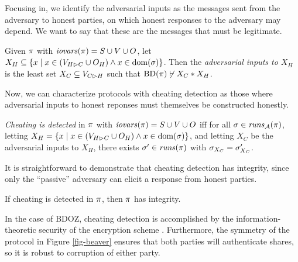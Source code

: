 Focusing in, we identify the adversarial inputs as the messages
sent from the adversary to honest parties, on which honest responses
to the adversary may depend. We want to say that these are the messages
that must be legitimate.
\begin{definition}
  Given $\pi$ with $\mathit{iovars}(\pi) = S \cup V \cup O$,
  let $X_H \subseteq \{ x \mid x \in (V_{H \rhd C} \cup O_H) \wedge x \in \mathrm{dom}(\sigma) \}$.
  Then the \emph{adversarial inputs to $X_H$} is the least set
  $X_C \subseteq V_{C \rhd H}$ such that $\mathrm{BD}(\pi) \not\vdash X_C * X_H$.
\end{definition}
Now, we can characterize protocols with cheating detection as those where
adversarial inputs to honest reponses must themselves be constructed honestly. 
\begin{definition}
  \emph{Cheating is detected} in $\pi$ with $\mathit{iovars}(\pi) = S \cup V \cup O$ iff
  for all  $\sigma \in \mathit{runs}_{\mathcal{A}}(\pi)$,
  letting $X_H = \{ x \mid x \in (V_{H \rhd C} \cup O_H) \wedge x \in \mathrm{dom}(\sigma) \}$,
  and letting $X_C$ be the adversarial inputs to $X_H$,
  there exists $\sigma'\in \mathit{runs}(\pi)$
  with $\sigma_{X_C} = \sigma'_{X_C}$.  
\end{definition}

It is straightforward to demonstrate that cheating detection has integrity,
since only the ``passive'' adversary can elicit a response from honest parties. 
\begin{lemma}
  \label{lemma-cheating}
  If cheating is detected in $\pi$, then $\pi$ has integrity.
\end{lemma}

In the case of BDOZ, cheating detection is accomplished by the information-theoretic
security of the encryption scheme \cite{evans2018pragmatic}. Furthermore, the symmetry of
the protocol in Figure \ref{fig-beaver} ensures that both parties will authenticate
shares, so it is robust to corruption of either party. 
